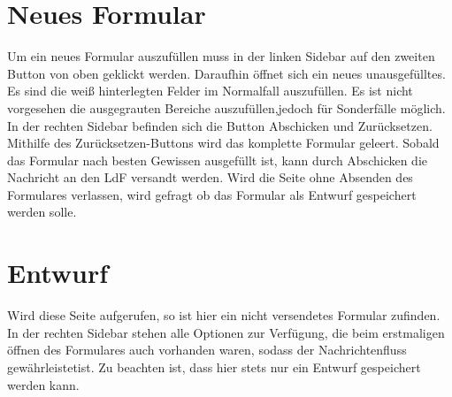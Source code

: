 \documentclass[a4paper,11pt,oneside, titlepage]{article}
\begin{document}
	\section{Neues Formular}
	Um ein neues Formular auszufüllen muss in der linken Sidebar auf den zweiten Button von oben geklickt werden. Daraufhin öffnet sich ein neues unausgefülltes. Es sind die weiß hinterlegten Felder im Normalfall auszufüllen. Es ist nicht vorgesehen die ausgegrauten Bereiche auszufüllen,jedoch für Sonderfälle möglich.
	\newline
	In der rechten Sidebar befinden sich die Button \glqq{}Abschicken\grqq{} und \glqq{}Zurücksetzen\grqq{}.
	Mithilfe des Zurücksetzen-Buttons wird das komplette Formular geleert. Sobald das Formular nach besten Gewissen ausgefüllt ist, kann durch \glqq{} Abschicken \grqq{} die Nachricht an den LdF versandt werden.
	\newline
	Wird die Seite ohne Absenden des Formulares verlassen, wird gefragt ob das Formular als Entwurf gespeichert werden solle.
	
	\section{Entwurf}
	Wird diese Seite aufgerufen, so ist hier ein nicht versendetes Formular zufinden. In der rechten Sidebar stehen alle Optionen zur Verfügung, die beim erstmaligen öffnen des Formulares auch vorhanden waren, sodass der Nachrichtenfluss gewährleistetist.
	\newline
	Zu beachten ist, dass hier stets nur ein Entwurf gespeichert werden kann. 
	
\end{document}

